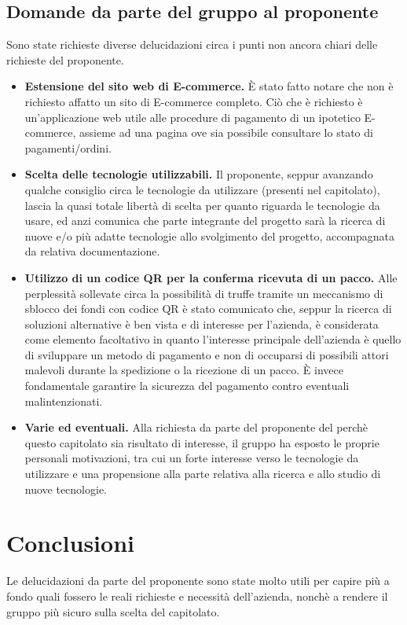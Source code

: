 \documentclass[a4paper,12pt]{article}
\begin{document}
\subsection{Domande da parte del gruppo al proponente}
Sono state richieste diverse delucidazioni circa i punti non ancora chiari delle richieste del proponente.

\begin{itemize}
	\item \textbf{Estensione del sito web di E-commerce.} 
	È stato fatto notare che non è richiesto affatto un sito di E-commerce completo. Ciò che è richiesto è un'applicazione web utile alle procedure di pagamento di un ipotetico E-commerce, assieme ad una pagina ove sia possibile consultare lo stato di pagamenti/ordini.
	\item \textbf{Scelta delle tecnologie utilizzabili.} 
	Il proponente, seppur avanzando qualche consiglio circa le tecnologie da utilizzare (presenti nel capitolato), lascia la quasi totale libertà di scelta per quanto riguarda le tecnologie da usare, ed anzi comunica che parte integrante del progetto sarà la ricerca di nuove e/o più adatte tecnologie allo svolgimento del progetto, accompagnata da relativa documentazione.
	\item \textbf{Utilizzo di un codice QR per la conferma ricevuta di un pacco.}
	Alle perplessità sollevate circa la possibilità di truffe tramite un meccanismo di sblocco dei fondi con codice QR è stato comunicato che, seppur la ricerca di soluzioni alternative è ben vista e di interesse per l'azienda, è considerata come elemento facoltativo in quanto l'interesse principale dell'azienda è quello di sviluppare un metodo di pagamento e non di occuparsi di possibili attori malevoli durante la spedizione o la ricezione di un pacco. È invece fondamentale garantire la sicurezza del pagamento contro eventuali malintenzionati.
	\item \textbf{Varie ed eventuali.}
	Alla richiesta da parte del proponente del perchè questo capitolato sia risultato di interesse, il gruppo ha esposto le proprie personali motivazioni, tra cui un forte interesse verso le tecnologie da utilizzare e una propensione alla parte relativa alla ricerca e allo studio di nuove tecnologie.
\end{itemize}

\section{Conclusioni}
Le delucidazioni da parte del proponente sono state molto utili per capire più a fondo quali fossero le reali richieste e necessità dell'azienda, nonchè a rendere il gruppo più sicuro sulla scelta del capitolato.
\end{document}
